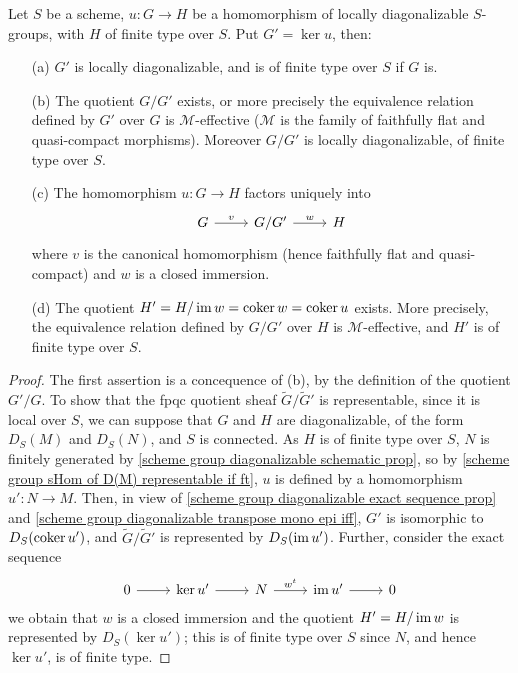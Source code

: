 \begin{corollary}\label{schem group diagonalizable morphism quotient by ker im prop}
Let $S$ be a scheme, $u:G\to H$ be a homomorphism of locally diagonalizable $S$-groups, with $H$ of finite type over $S$. Put $G'=\ker u$, then:
\begin{enumerate}
    \item[(a)] $G'$ is locally diagonalizable, and is of finite type over $S$ if $G$ is.
    \item[(b)] The quotient $G/G'$ exists, or more precisely the equivalence relation defined by $G'$ over $G$ is $\mathcal{M}$-effective ($\mathcal{M}$ is the family of faithfully flat and quasi-compact morphisms). Moreover $G/G'$ is locally diagonalizable, of finite type over $S$.
    \item[(c)] The homomorphism $u:G\to H$ factors uniquely into
    \[\begin{tikzcd}
    G\ar[r,"v"]&G/G'\ar[r,"w"]&H
    \end{tikzcd}\]
    where $v$ is the canonical homomorphism (hence faithfully flat and quasi-compact) and $w$ is a closed immersion.
    \item[(d)] The quotient $H'=H/\operatorname{im} w=\operatorname{coker} w=\operatorname{coker} u$ exists. More precisely, the equivalence relation defined by $G/G'$ over $H$ is $\mathcal{M}$-effective, and $H'$ is of finite type over $S$.
\end{enumerate}
\end{corollary}
\begin{proof}
The first assertion is a concequence of (b), by the definition of the quotient $G'/G$. To show that the fpqc quotient sheaf $\widetilde{G}/\widetilde{G}'$ is representable, since it is local over $S$, we can suppose that $G$ and $H$ are diagonalizable, of the form $D_S(M)$ and $D_S(N)$, and $S$ is connected. As $H$ is of finite type over $S$, $N$ is finitely generated by \cref{scheme group diagonalizable schematic prop}, so by \cref{scheme group sHom of D(M) representable if ft}, $u$ is defined by a homomorphism $u':N\to M$. Then, in view of \cref{scheme group diagonalizable exact sequence prop} and \cref{scheme group diagonalizable transpose mono epi iff}, $G'$ is isomorphic to $D_S(\operatorname{coker} u')$, and $\widetilde{G}/\widetilde{G}'$ is represented by $D_S(\operatorname{im} u')$. Further, consider the exact sequence
\[\begin{tikzcd}
0\ar[r]&\ker u'\ar[r]&N\ar[r,"w^t"]&\im u'\ar[r]&0
\end{tikzcd}\]
we obtain that $w$ is a closed immersion and the quotient $H'=H/\operatorname{im} w$ is represented by $D_S(\ker u')$; this is of finite type over $S$ since $N$, and hence $\ker u'$, is of finite type.
\end{proof}


